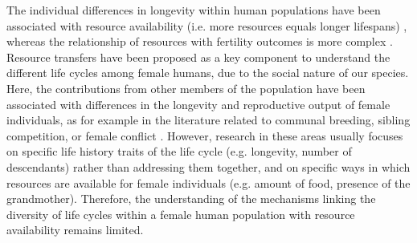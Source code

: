 \documentclass{article}
\begin{document}
The individual differences in longevity within human populations have been associated with resource availability (i.e. more resources equals longer lifespans) \citep{kaplan2003embodied}, whereas the relationship of resources with fertility outcomes is more complex \citep{mulder1998demographic,sear2016understanding}. Resource transfers have been proposed as a key component to understand the different life cycles among female humans, due to the social nature of our species. Here, the contributions from other members of the population have been associated with differences in the longevity and reproductive output of female individuals, as for example in the literature related to communal breeding, sibling competition, or female conflict \citep{ivey2000cooperative,nitsch2013elder,mace2012female,sear2011much}. However, research in these areas usually focuses on specific life history traits of the life cycle (e.g. longevity, number of descendants) rather than addressing them together, and on specific ways in which resources are available for female individuals (e.g. amount of food, presence of the grandmother). Therefore, the understanding of the mechanisms linking the diversity of life cycles within a female human population with resource availability remains limited.
\end{document}
